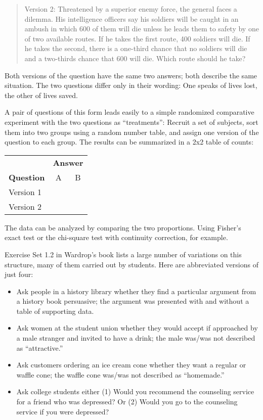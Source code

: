 \begin{quotation}
Version 2:  Threatened by a superior enemy force, the general faces a dilemma.  His intelligence officers say his soldiers will be caught in an ambush in which 600 of them will die unless he leads them to safety by one of two available routes.  If he takes the first route, 400 soldiers will die.  If he takes the second, there is a one-third chance that no soldiers will die and a two-thirds chance that 600 will die.  Which route should he take?
\end{quotation}

Both versions of the question have the same two answers; both describe the same situation.  The two questions differ only in their wording:  One speaks of lives lost, the other of lives saved.  

A pair of questions of this form leads easily to a simple randomized comparative experiment with the two questions as ``treatments'':  Recruit a set of subjects, sort them into two groups using a random number table, and assign one version of the question to each group.  The results can be summarized in a 2x2 table of counts:

\begin{table}[!ht]
\begin{center}
\begin{tabular}{l|cc}
& \multicolumn{2}{c}{\textbf{Answer}}\\
\textbf{Question}  & A & B \\
  \hline
Version 1 &  &  \\
Version 2 &  &  \\
\end{tabular}
\end{center}
\end{table}

The data can be analyzed by comparing the two proportions. Using Fisher's exact test or the chi-square test with continuity correction, for example.

\newpage

Exercise Set 1.2 in Wardrop's book lists a large number of variations on this structure, many of them carried out by students.  Here are abbreviated versions of just four:

\renewcommand{\labelitemi}{$\closedsucc$}
\begin{itemize}[leftmargin=1cm, itemsep=.2em]
\item Ask people in a history library whether they find a particular argument from a history book persuasive; the argument was presented with and without a table of supporting data.
\item Ask women at the student union whether they would accept if approached by a male stranger and invited to have a drink; the male was/was not described as ``attractive.''
\item Ask customers ordering an ice cream cone whether they want a regular or waffle cone; the waffle cone was/was not described as ``homemade.''
\item Ask college students either (1) Would you recommend the counseling service for a friend who was depressed? Or (2) Would you go to the counseling service if you were depressed?
\end{itemize}


